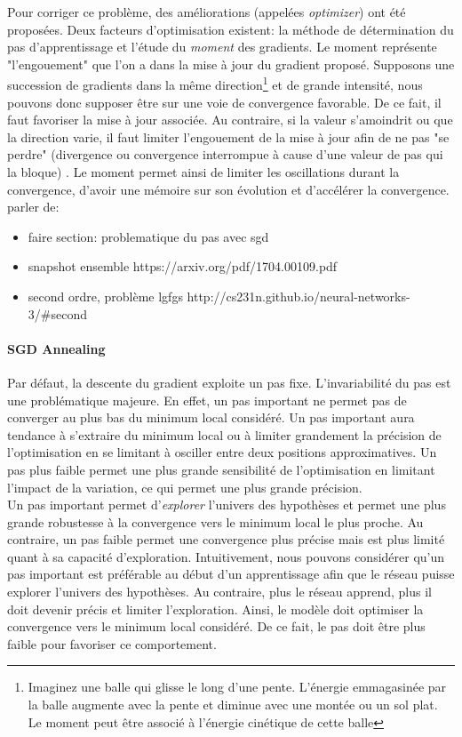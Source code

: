 \noindent Pour corriger ce problème, des améliorations (appelées \textit{optimizer}) ont été proposées. Deux facteurs d'optimisation existent: la méthode de détermination du pas d'apprentissage et l'étude du \textit{moment} des gradients. Le moment représente "l'engouement" que l'on a dans la mise à jour du gradient proposé. Supposons une succession de gradients dans la même direction\footnote{Imaginez une balle qui glisse le long d'une pente. L'énergie emmagasinée par la balle augmente avec la pente et diminue avec une montée ou un sol plat. Le moment peut être associé à l'énergie cinétique de cette balle} et de grande intensité, nous pouvons donc supposer être sur une voie de convergence favorable. De ce fait, il faut favoriser la mise à jour associée. Au contraire, si la valeur s'amoindrit ou que la direction varie, il faut limiter l'engouement de la mise à jour afin de ne pas "se perdre" (divergence ou convergence interrompue à cause d'une valeur de pas qui la bloque) . Le moment permet ainsi de limiter les oscillations durant la convergence, d'avoir une mémoire sur son évolution et d'accélérer la convergence.\\

\noindent parler de:
\begin{itemize}
    \item faire section: problematique du pas avec sgd
    \item snapshot ensemble https://arxiv.org/pdf/1704.00109.pdf
    \item second ordre, problème lgfgs http://cs231n.github.io/neural-networks-3/\#second
\end{itemize}

\paragraph{SGD Annealing}
Par défaut, la descente du gradient exploite un pas fixe. L'invariabilité du pas est une problématique majeure. En effet, un pas important ne permet pas de converger au plus bas du minimum local considéré. Un pas important aura tendance à s'extraire du minimum local ou à limiter grandement la précision de l'optimisation en se limitant à osciller entre deux positions approximatives. Un pas plus faible permet une plus grande sensibilité de l'optimisation en limitant l'impact de la variation, ce qui permet une plus grande précision. \\

\noindent Un pas important permet d'\textit{explorer} l'univers des hypothèses et permet une plus grande robustesse à la convergence vers le minimum local le plus proche. Au contraire, un pas faible permet une convergence plus précise mais est plus limité quant à sa capacité d'exploration. Intuitivement, nous pouvons considérer qu'un pas important est préférable au début d'un apprentissage afin que le réseau puisse explorer l'univers des hypothèses. Au contraire, plus le réseau apprend, plus il doit devenir précis et limiter l'exploration. Ainsi, le modèle doit optimiser la convergence vers le minimum local considéré. De ce fait, le pas doit être plus faible pour favoriser ce comportement.\\

